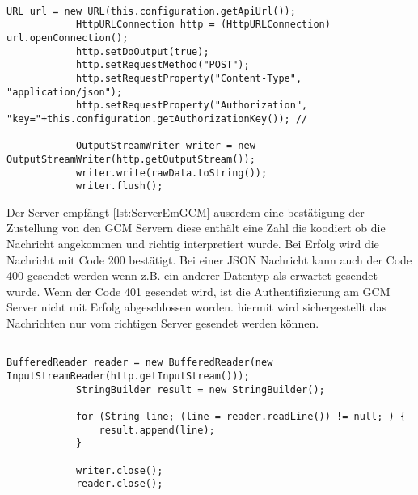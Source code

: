 \begin{lstlisting}[caption={Senden von Nachrichten vom Server},label=lst:ServerSeGCM]

URL url = new URL(this.configuration.getApiUrl());
			HttpURLConnection http = (HttpURLConnection) url.openConnection();
			http.setDoOutput(true);
			http.setRequestMethod("POST");
			http.setRequestProperty("Content-Type", "application/json");
			http.setRequestProperty("Authorization", "key="+this.configuration.getAuthorizationKey()); //
			
			OutputStreamWriter writer = new OutputStreamWriter(http.getOutputStream());
			writer.write(rawData.toString());
			writer.flush();

\end{lstlisting}

Der Server empfängt \ref{lst:ServerEmGCM} auserdem eine bestätigung der Zustellung von den GCM Servern diese enthält eine Zahl die koodiert ob die Nachricht angekommen und richtig interpretiert wurde. Bei Erfolg wird die Nachricht mit Code 200 bestätigt. Bei einer JSON Nachricht kann auch der Code 400 gesendet werden wenn z.B. ein anderer Datentyp als erwartet gesendet wurde. Wenn der Code 401 gesendet wird, ist die Authentifizierung am GCM Server nicht mit Erfolg abgeschlossen worden. hiermit wird sichergestellt das Nachrichten nur vom richtigen Server gesendet werden können. 


\begin{lstlisting}[caption={Empfangen von Bestätigungen am Server},label=lst:ServerEmGCM]

BufferedReader reader = new BufferedReader(new InputStreamReader(http.getInputStream()));
			StringBuilder result = new StringBuilder();
			
			for (String line; (line = reader.readLine()) != null; ) {
				result.append(line);
			}

			writer.close();
			reader.close();

\end{lstlisting}
